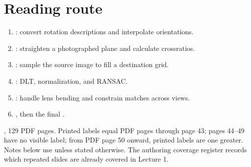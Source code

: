 \documentclass[letterpaper,11pt,english,openany,oneside]{jupyterBook}
\begin{document}
\section{Reading route}
\label{\detokenize{lectures/lecture02/index:reading-route}}\begin{enumerate}
%
\item {}
\sphinxAtStartPar
{\hyperref[\detokenize{lectures/lecture02/quaternions::doc}]{}}: convert rotation descriptions and interpolate orientations.

\item {}
\sphinxAtStartPar
{\hyperref[\detokenize{lectures/lecture02/homographies::doc}]{}}: straighten a photographed plane and calculate cross\sphinxhyphen{}ratios.

\item {}
\sphinxAtStartPar
{\hyperref[\detokenize{lectures/lecture02/warping::doc}]{}}: sample the source image to fill a destination grid.

\item {}
\sphinxAtStartPar
{\hyperref[\detokenize{lectures/lecture02/estimation::doc}]{}}: DLT, normalization, and RANSAC.

\item {}
\sphinxAtStartPar
{\hyperref[\detokenize{lectures/lecture02/two-view::doc}]{}}: handle lens bending and constrain matches across views.

\item {}
\sphinxAtStartPar
{\hyperref[\detokenize{lectures/lecture02/review::doc}]{}}, then the final {\hyperref[\detokenize{lectures/lecture02/tldr::doc}]{}}.

\end{enumerate}

\sphinxAtStartPar
{} , 129 PDF pages. Printed labels equal PDF pages through page 43; pages 44–49 have no visible label; from PDF page 50 onward, printed labels are one greater. Notes below use  unless stated otherwise. The authoring coverage register records which repeated slides are already covered in Lecture 1.
\end{document}
